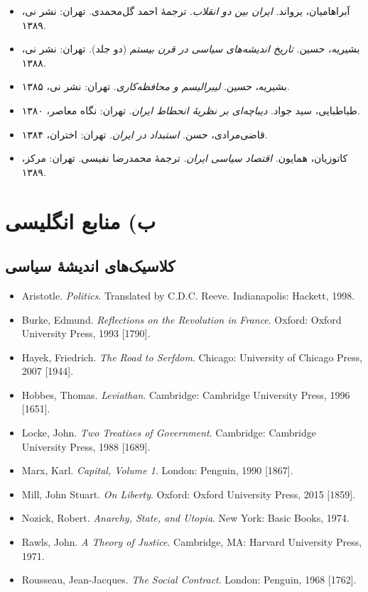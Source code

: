 \begin{itemize}[rightmargin=2cm]
    \item آبراهامیان، یرواند. \textit{ایران بین دو انقلاب}. ترجمهٔ احمد گل‌محمدی. تهران: نشر نی، ۱۳۸۹.
    \item بشیریه، حسین. \textit{تاریخ اندیشه‌های سیاسی در قرن بیستم} (دو جلد). تهران: نشر نی، ۱۳۸۸.
    \item بشیریه، حسین. \textit{لیبرالیسم و محافظه‌کاری}. تهران: نشر نی، ۱۳۸۵.
    \item طباطبایی، سید جواد. \textit{دیباچه‌ای بر نظریهٔ انحطاط ایران}. تهران: نگاه معاصر، ۱۳۸۰.
    \item قاضی‌مرادی، حسن. \textit{استبداد در ایران}. تهران: اختران، ۱۳۸۴.
    \item کاتوزیان، همایون. \textit{اقتصاد سیاسی ایران}. ترجمهٔ محمدرضا نفیسی. تهران: مرکز، ۱۳۸۹.
\end{itemize}

\section*{ب) منابع انگلیسی}

\subsection*{کلاسیک‌های اندیشهٔ سیاسی}

\begin{itemize}[rightmargin=2cm]
    \item Aristotle. \textit{Politics}. Translated by C.D.C. Reeve. Indianapolis: Hackett, 1998.
    \item Burke, Edmund. \textit{Reflections on the Revolution in France}. Oxford: Oxford University Press, 1993 [1790].
    \item Hayek, Friedrich. \textit{The Road to Serfdom}. Chicago: University of Chicago Press, 2007 [1944].
    \item Hobbes, Thomas. \textit{Leviathan}. Cambridge: Cambridge University Press, 1996 [1651].
    \item Locke, John. \textit{Two Treatises of Government}. Cambridge: Cambridge University Press, 1988 [1689].
    \item Marx, Karl. \textit{Capital, Volume 1}. London: Penguin, 1990 [1867].
    \item Mill, John Stuart. \textit{On Liberty}. Oxford: Oxford University Press, 2015 [1859].
    \item Nozick, Robert. \textit{Anarchy, State, and Utopia}. New York: Basic Books, 1974.
    \item Rawls, John. \textit{A Theory of Justice}. Cambridge, MA: Harvard University Press, 1971.
    \item Rousseau, Jean-Jacques. \textit{The Social Contract}. London: Penguin, 1968 [1762].
\end{itemize}

